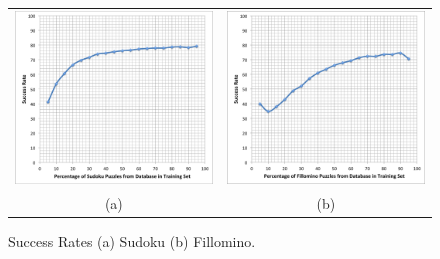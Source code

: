 \begin{figure}[!htpb]
\centering
\begin{tabular}{c c}
\includegraphics[scale=0.40]{experimentgraphs/sudokuSuccessRate2.png}
&
\includegraphics[scale=0.40]{experimentgraphs/fillominoSuccessRate2.png}
\\
(a) & (b)
\end{tabular}
\caption{Success Rates (a) Sudoku (b) Fillomino.}
\label{successrates}
\end{figure}






